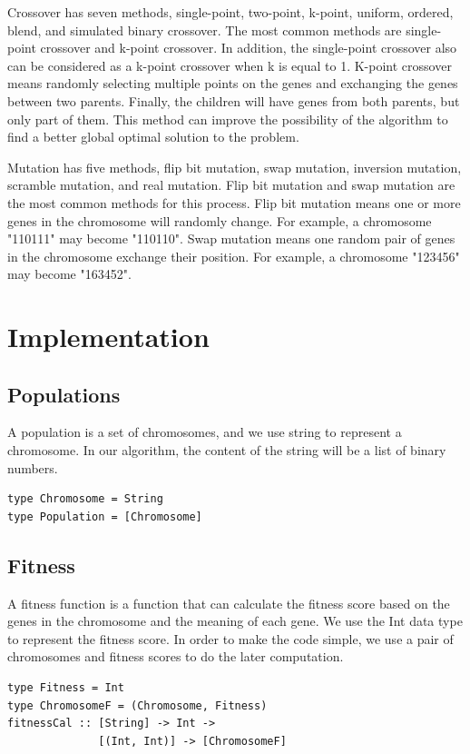 \documentclass[sigconf]{acmart}
\begin{document}
Crossover has seven methods, single-point, two-point, k-point, uniform, ordered, blend, and simulated binary crossover. The most common methods are single-point crossover and k-point crossover. In addition, the single-point crossover also can be considered as a k-point crossover when k is equal to 1. K-point crossover means randomly selecting multiple points on the genes and exchanging the genes between two parents. Finally, the children will have genes from both parents, but only part of them. This method can improve the possibility of the algorithm to find a better global optimal solution to the problem.

Mutation has five methods, flip bit mutation, swap mutation, inversion mutation, scramble mutation, and real mutation. Flip bit mutation and swap mutation are the most common methods for this process. Flip bit mutation means one or more genes in the chromosome will randomly change. For example, a chromosome "110111" may become "110110". Swap mutation means one random pair of genes in the chromosome exchange their position. For example, a chromosome "123456" may become "163452".

\section{Implementation}
\label{Implementation}

\subsection{Populations}
A population is a set of chromosomes, and we use string to represent a chromosome. In our algorithm, the content of the string will be a list of binary numbers. 
\begin{lstlisting}
type Chromosome = String
type Population = [Chromosome]
\end{lstlisting}

\subsection{Fitness}
A fitness function is a function that can calculate the fitness score based on the genes in the chromosome and the meaning of each gene. We use the Int data type to represent the fitness score. In order to make the code simple, we use a pair of chromosomes and fitness scores to do the later computation. 
\begin{lstlisting}
type Fitness = Int
type ChromosomeF = (Chromosome, Fitness)
fitnessCal :: [String] -> Int -> 
              [(Int, Int)] -> [ChromosomeF]
 \end{lstlisting}
\end{document}
